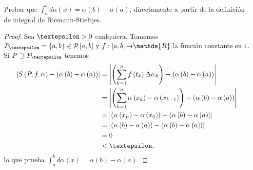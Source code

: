 \setcounter{section}{7}
\setcounter{exercise}{0}

\begin{exercise}
  Probar que $\int_{a}^{b}d\alpha\left(x\right)=\alpha\left(b\right)-\alpha\left(a\right)$, directamente a partir de la definición de integral de Riemann-Stieltjes.
\end{exercise}

\begin{proof}

Sea $\text{\textepsilon}>0$ cualquiera. Tomemos $P_{\text{\textepsilon}}=\left\lbrace a,b\right\rbrace\in\mathcal{P}\left[a,b\right]$ y $f:\left[a,b\right]\text{\textrightarrow}\mathds{R}$ la función constante en $1$. Si $P\supseteq P_{\text{\textepsilon}}$ tenemos
\begin{align*}
  \left| S\left(P,f,\alpha\right)-\left(\alpha\left(b\right)-\alpha\left(a\right)\right)\right|&=\left|\left(\sum_{k=1}^{n}f\left(t_k\right)\Delta\alpha_k\right)-\left(\alpha\left(b\right)-\alpha\left(a\right)\right) \right|\\
  &=\left|\left(\sum_{k=1}^{n} \alpha\left(x_k\right)-\alpha\left(x_{k-1}\right)\right)-\left(\alpha\left(b\right)-\alpha\left(a\right)\right)\right|\\
  &=\left|\left(\alpha\left(x_n\right)-\alpha\left(x_0\right)\right)-\left(\alpha\left(b\right)-\alpha\left(a\right)\right)\right|\\
  &=\left|\left(\alpha\left(b\right)-\alpha\left(a\right)\right)-\left(\alpha\left(b\right)-\alpha\left(a\right)\right)\right|\\
  &=0\\
  &<\text{\textepsilon},
\end{align*}
lo que prueba $\int_{a}^{b}d\alpha\left(x\right)=\alpha\left(b\right)-\alpha\left(a\right)$.
  
\end{proof}
